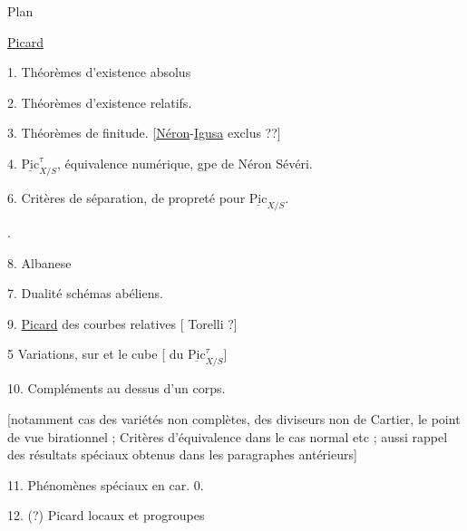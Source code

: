 Plan

\uline{Picard}

1. Théorèmes d'existence absolus

2. Théorèmes d'existence relatifs.

\noindent{}3.  Théorèmes de finitude. [\uline{Néron}-\uline{Igusa} exclus ??]

4. $\underline{\mathrm{Pic}}^{\tau}_{X/S}$, équivalence numérique, gpe de Néron Sévéri.

6. Critères de  séparation, de propreté pour $\underline{\mathrm{Pic}}_{X/S}$.

 .

8. Albanese

7. Dualité schémas abéliens.

9. \uline{Picard} des courbes relatives [ Torelli ?]

5  Variations, sur   et le cube [ du $\underline{\mathrm{Pic}}^{\tau}_{X/S}$]

10. Compléments au dessus d'un corps.

[notamment cas des variétés non complètes, des diviseurs non de Cartier, le point de vue birationnel ; \deleted{\unsure{etc.]}} Critères d'équivalence dans le cas normal etc \deleted{\unsure{etc]}} ; aussi rappel des résultats spéciaux obtenus dans les paragraphes antérieurs]

11. Phénomènes spéciaux en car. 0.

12. (?) Picard locaux et progroupes \unsure{---|\ldots}


